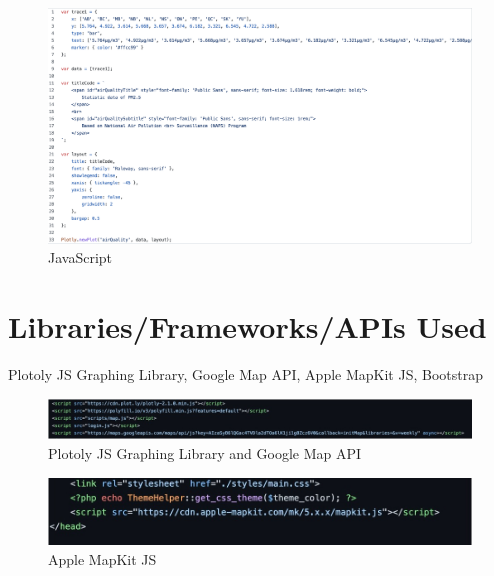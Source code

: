 \documentclass[12pt, letterpaper]{article}
\begin{document}
 \begin{figure}[htbp]
	\centering
	\includegraphics[width=5in]{images/q1_3.png}
	\caption{JavaScript}
 \end{figure}

 \newpage

\section{Libraries/Frameworks/APIs Used}
Plotoly JS Graphing Library, Google Map API, Apple MapKit JS, Bootstrap

\begin{figure}[htbp]
	\centering
	\includegraphics[width=6in]{images/q2.jpg}
	\caption{Plotoly JS Graphing Library and Google Map API }
 \end{figure}
 
 \begin{figure}[htbp]
	\centering
	\includegraphics[width=6in]{images/q2_2.jpg}
	\caption{Apple MapKit JS  }
 \end{figure}

 \newpage

\end{document}
